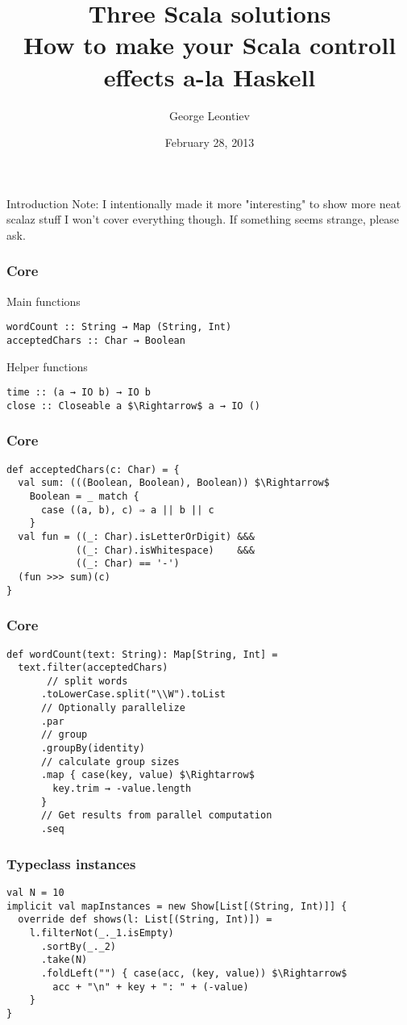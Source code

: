 \documentclass{beamer}
\title[Three Scala solutions]{Three Scala solutions\\How to make your Scala controll effects a-la Haskell}
\author{George Leontiev}
\institute{folone.info}
\date{February 28, 2013}
\begin{document}
\begin{frame}
\titlepage
\end{frame}


\begin{frame}{Introduction}
  Note: I intentionally made it more "interesting" to show more neat scalaz stuff\newline
  I won't cover everything though. If something seems strange, please ask.
\end{frame}

\begin{frame}[fragile]
\frametitle{Core}
Main functions
\begin{lstlisting}[mathescape]
wordCount :: String → Map (String, Int)
acceptedChars :: Char → Boolean
\end{lstlisting}
Helper functions
\begin{lstlisting}[mathescape]
time :: (a → IO b) → IO b
close :: Closeable a $\Rightarrow$ a → IO ()
\end{lstlisting}
\end{frame}

\begin{frame}[fragile]
\frametitle{Core}
\begin{lstlisting}[mathescape]
def acceptedChars(c: Char) = {
  val sum: (((Boolean, Boolean), Boolean)) $\Rightarrow$
    Boolean = _ match {
      case ((a, b), c) ⇒ a || b || c
    }
  val fun = ((_: Char).isLetterOrDigit) &&&
            ((_: Char).isWhitespace)    &&&
            ((_: Char) == '-')
  (fun >>> sum)(c)
}
\end{lstlisting}
\end{frame}

\begin{frame}[fragile]
\frametitle{Core}
\begin{lstlisting}[mathescape]
def wordCount(text: String): Map[String, Int] =
  text.filter(acceptedChars)
       // split words
      .toLowerCase.split("\\W").toList
      // Optionally parallelize
      .par
      // group
      .groupBy(identity)
      // calculate group sizes
      .map { case(key, value) $\Rightarrow$
        key.trim → -value.length
      }
      // Get results from parallel computation
      .seq
\end{lstlisting}
\end{frame}

\begin{frame}[fragile]
\frametitle{Typeclass instances}
\begin{lstlisting}[mathescape]
val N = 10
implicit val mapInstances = new Show[List[(String, Int)]] {
  override def shows(l: List[(String, Int)]) =
    l.filterNot(_._1.isEmpty)
      .sortBy(_._2)
      .take(N)
      .foldLeft("") { case(acc, (key, value)) $\Rightarrow$
        acc + "\n" + key + ": " + (-value)
    }
}
\end{lstlisting}
\end{frame}
\end{document}
